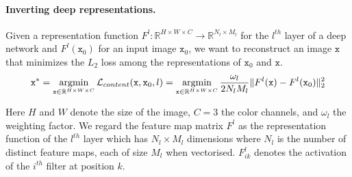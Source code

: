 \documentclass{article}
\begin{document}
\paragraph{Inverting deep representations.}
Given a representation function $F^l: \mathbb{R}^{H \times W \times C} \rightarrow \mathbb{R}^{N_l \times M_l}$ for the $l^{th}$ layer of a deep network and %
 $F^l (\texttt{x}_0)$ for an input image $\texttt{x}_0$,
we want to reconstruct an image $\texttt{x}$ that minimizes the $L_2$ loss among the representations of $\texttt{x}_0$ and $\texttt{x}$. %
\setlength{\belowdisplayskip}{2pt}
\setlength{\abovedisplayskip}{2pt}
\begin{equation}
\texttt{x}^* = \operatornamewithlimits{argmin}_{ \texttt{x} \in \mathbb{R}^{H \times W \times C} } \mathcal{L}_{content} (\texttt{x}, \texttt{x}_0, l) =  \operatornamewithlimits{argmin}_{ \texttt{x} \in \mathbb{R}^{H \times W \times C} } \frac{\omega_l}{2 N_l M_l} \lVert F^l(\texttt{x})- F^l(\texttt{x}_0) \rVert _2^2
\label{eq:contentLoss}
\end{equation}

Here $H$ and $W$ denote the size of the image, $C = 3$ the color channels, and
 $\omega_l$ the weighting factor.
We regard the feature map matrix $F^l$ as the representation function of the $l^{th}$ layer
 which has $N_l \times M_l$ dimensions where $N_l$ is the number of distinct feature maps, each of size $M_l$ when vectorised.
$F_{ik}^l$ denotes the activation of the $i^{th}$ filter at position $k$.
\end{document}
